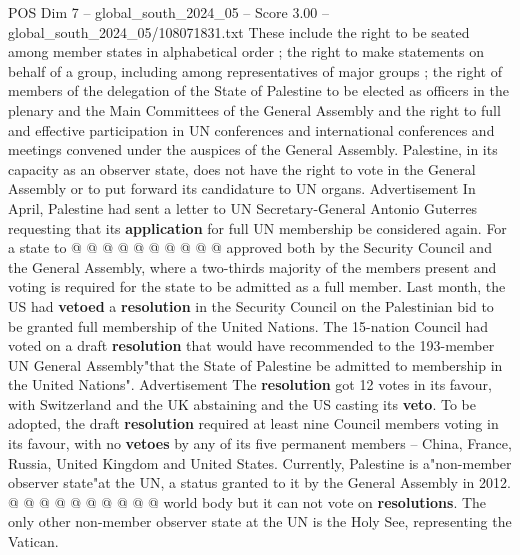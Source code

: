 \begin{textsample}{POS Dim 7 – global\_south\_2024\_05 – Score 3.00 – global\_south\_2024\_05/108071831.txt}
These include the right to be seated among member states in alphabetical order ; the right to make statements on behalf of a group, including among representatives of major groups ; the right of members of the delegation of the State of Palestine to be elected as officers in the plenary and the Main Committees of the General Assembly and the right to full and effective participation in UN conferences and international conferences and meetings convened under the auspices of the General Assembly.
Palestine, in its capacity as an observer state, does not have the right to vote in the General Assembly or to put forward its candidature to UN organs.
Advertisement In April, Palestine had sent a letter to UN Secretary-General Antonio Guterres requesting that its \textbf{application} for full UN membership be considered again.
For a state to @ @ @ @ @ @ @ @ @ @ approved both by the Security Council and the General Assembly, where a two-thirds majority of the members present and voting is required for the state to be admitted as a full member.
Last month, the US had \textbf{vetoed} a \textbf{resolution} in the Security Council on the Palestinian bid to be granted full membership of the United Nations.
The 15-nation Council had voted on a draft \textbf{resolution} that would have recommended to the 193-member UN General Assembly"that the State of Palestine be admitted to membership in the United Nations".
Advertisement The \textbf{resolution} got 12 votes in its favour, with Switzerland and the UK abstaining and the US casting its \textbf{veto}.
To be adopted, the draft \textbf{resolution} required at least nine Council members voting in its favour, with no \textbf{vetoes} by any of its five permanent members -- China, France, Russia, United Kingdom and United States.
Currently, Palestine is a"non-member observer state"at the UN, a status granted to it by the General Assembly in 2012. @ @ @ @ @ @ @ @ @ @ world body but it can not vote on \textbf{resolutions}.
The only other non-member observer state at the UN is the Holy See, representing the Vatican.

\end{textsample}
